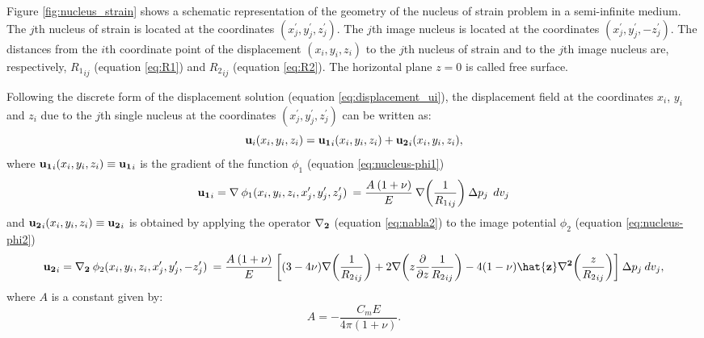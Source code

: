 \documentclass[journal abbreviation, manuscript]{copernicus}
\begin{document}
Figure \ref{fig:nucleus_strain} shows a schematic representation of the geometry
of the nucleus of strain problem in a semi-infinite medium. 
The $j$th nucleus of strain is located at the coordinates 
$(x^{\prime}_{j}, y^{\prime}_{j}, z^{\prime}_{j})$. 
The $j$th image nucleus is located at the coordinates 
$(x^{\prime}_{j}, y^{\prime}_{j}, - z^{\prime}_{j})$.
The distances from the $i$th coordinate point of the displacement $ (x_{i}, y_{i}, z_{i})$ to the $j$th nucleus of strain and to the $j$th image nucleus are, respectively,  
$ {R_1}_{ij}$ (equation \ref{eq:R1})  and $ {R_2}_{ij}$ (equation \ref{eq:R2}).
The horizontal plane $z = 0$ is called free surface.
 
Following the discrete form of the displacement solution (equation \ref{eq:displacement_ui}), 
the displacement field at the coordinates $x_i$, $y_i$  and $z_i$  due to the $j$th single nucleus at the coordinates $(x^{\prime}_{j}, y^{\prime}_{j}, z^{\prime}_{j})$ can be written as:
\begin{equation}
{\bf{u}}_{i} (x_i,y_i,z_i) = {\bf{u_{1}}}_{i} (x_i,y_i,z_i) + {\bf{u_{2}}}_{i} (x_i,y_i,z_i), 
\label{eq:nucleus-ui_total}
\end{equation}
where ${\bf{u_{1}}}_{i} (x_i,y_i,z_i) \equiv {\bf{u_{1}}}_{i} $ is the gradient of the function $\phi_1$ (equation \ref{eq:nucleus-phi1}) 
\begin{equation}
{\bf{u_{1}}}_{i}  = {\bf{\nabla}} \: {\phi_{1}(x_{i}, y_{i}, z_{i}, x^{\prime}_{j}, y^{\prime}_{j}, z^{\prime}_{j})} \:
= \frac{A  \: (1 + \nu)}{E} \: {\bf{\nabla}} \bigg( {\frac{1}{{R_1}_{ij}}} \bigg) 
\: \Delta p_{j} \: \:dv_j
\label{eq:nucleus-u1}
\end{equation}
and ${\bf{u_{2}}}_{i} (x_i,y_i,z_i) \equiv {\bf{u_{2}}}_{i} $ is obtained by  applying the operator ${\bf{{\nabla}_{2}}}$ (equation \ref{eq:nabla2}) to the image potential $\phi_2$ (equation \ref{eq:nucleus-phi2})
\begin{equation}
{\bf{u_{2}}}_{i} = {\bf{{\nabla}_{2}}} \: {\phi_{2}(x_{i}, y_{i}, z_{i}, x^{\prime}_{j}, y^{\prime}_{j}, -z^{\prime}_{j})} \:  
= \frac{A  \: (1 + \nu)}{E} \: 
\bigg[ 
(3 - 4\nu){\bf{\nabla}} \bigg(  {\frac{1}{{R_2}_{ij}}} \bigg)     
+ 2 {\bf{\nabla}} \bigg( z \frac{\partial }{\partial z} {\frac{1}{{R_2}_{ij}}} \bigg)  
- 4(1- \nu){\bf{\hat{z}}} {\bf{{\nabla}^{2}}}  \bigg( {\frac{z}{{R_2}_{ij}}} \bigg)
\bigg]   \: \Delta p_{j}  \:dv_j , 
\label{eq:nucleus-u2}
\end{equation}
where  $A$ is a constant given by: 
\begin{equation}
A = - \frac{C_m E}{4 \pi (1 + \nu)}.  
\label{eq:nucleus-A}
\end{equation}
\end{document}
